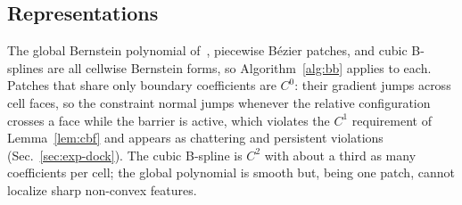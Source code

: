 \documentclass[journal]{IEEEtran}
\theoremstyle{definition}
\begin{document}
\subsection{Representations}\label{sec:repr}
The global Bernstein polynomial of~\cite{jo2026geometry}, piecewise B\'ezier patches, and cubic
B-splines are all cellwise Bernstein forms, so Algorithm~\ref{alg:bb} applies to each. Patches that
share only boundary coefficients are $C^0$: their gradient jumps across cell faces, so the
constraint normal jumps whenever the relative configuration crosses a face while the barrier is
active, which violates the $C^1$ requirement of Lemma~\ref{lem:cbf} and appears as chattering and
persistent violations (Sec.~\ref{sec:exp-dock}). The cubic B-spline is $C^2$ with about a third as
many coefficients per cell; the global polynomial is smooth but, being one patch, cannot localize
sharp non-convex features.

\end{document}
